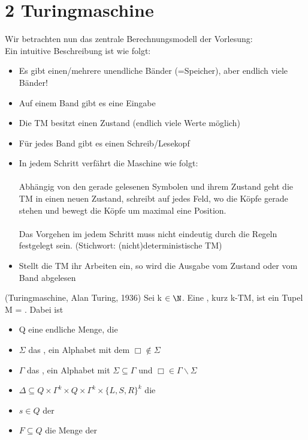\documentclass[a4paper]{article}
\begin{document}
\section{2 Turingmaschine}
Wir betrachten nun das zentrale Berechnungsmodell der Vorlesung:
 \\
Ein intuitive Beschreibung ist wie folgt:
\begin{itemize}
 \item Es gibt einen/mehrere unendliche Bänder (=Speicher), aber endlich viele Bänder!
 \item Auf einem Band gibt es eine Eingabe
 \item Die TM besitzt einen Zustand (endlich viele Werte möglich)
 \item Für jedes Band gibt es einen Schreib/Lesekopf
 \item In jedem Schritt verfährt die Maschine wie folgt: \\
 \\
 Abhängig von den gerade gelesenen Symbolen und ihrem Zustand geht die TM in einen neuen Zustand, schreibt auf jedes Feld, wo die Köpfe gerade stehen und bewegt die Köpfe um maximal eine Position. \\
 \\
 Das Vorgehen im jedem Schritt muss nicht eindeutig durch die Regeln festgelegt sein. (Stichwort: (nicht)deterministische TM)
 \item Stellt die TM ihr Arbeiten ein, so wird die Ausgabe vom Zustand oder vom Band abgelesen
\end{itemize}
\begin{DefBox}{(Turingmaschine, Alan Turing, 1936)}
 Sei k $\in \N$. Eine , kurz k-TM, ist ein Tupel M = \TM. Dabei ist
 \begin{itemize}
  \item Q eine endliche Menge, die 
  \item $\Sigma$ das , ein Alphabet mit dem $\Box \not \in \Sigma$
  \item $\Gamma$ das , ein Alphabet mit $\Sigma \subseteq \Gamma$ und $\Box \in \Gamma \backslash \Sigma$
  \item $\Delta \subseteq Q \times \Gamma^k \times Q \times \Gamma^k \times \lbrace L,S,R \rbrace^k$ die 
  \item $s \in Q$ der 
  \item $F \subseteq Q$ die Menge der 
 \end{itemize}
\end{DefBox}
\end{document}
